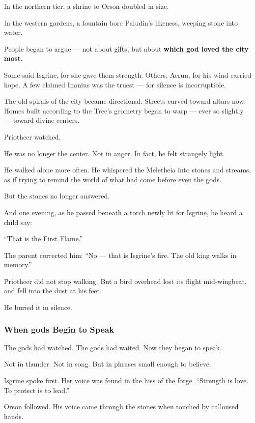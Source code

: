 \documentclass[12pt]{article}
\begin{document}
In the northern tier, a shrine to Orson doubled in size.  

In the western gardens, a fountain bore Paludin’s likeness, weeping stone into water.

People began to argue — not about gifts,  
but about \textbf{which god loved the city most.}

Some said Isgrine, for she gave them strength.  
Others, Aerun, for his wind carried hope.  
A few claimed Inanius was the truest — for silence is incorruptible.

The old spirals of the city became directional.  
Streets curved toward altars now.  
Homes built according to the Tree’s geometry began to warp — ever so slightly — toward divine centers.

Priotheer watched.

He was no longer the center.  
Not in anger.  
In fact, he felt strangely light.

He walked alone more often.  
He whispered the Meletheia into stones and streams,  
as if trying to remind the world of what had come before even the gods.

But the stones no longer answered.

And one evening, as he passed beneath a torch newly lit for Isgrine,  
he heard a child say:

 “That is the First Flame.”

The parent corrected him:  
 “No — that is Isgrine’s fire. The old king walks in memory.”

Priotheer did not stop walking.  
But a bird overhead lost its flight mid-wingbeat,  
and fell into the dust at his feet.

He buried it in silence.

\dotfill

\subsubsection{When gods Begin to Speak}

The gods had watched.  
The gods had waited.  
Now they began to speak.

Not in thunder. Not in song.  
But in phrases small enough to believe.

Isgrine spoke first.  
Her voice was found in the hiss of the forge.  
 “Strength is love. To protect is to lead.”

Orson followed.  
His voice came through the stones when touched by calloused hands. 
\end{document}

